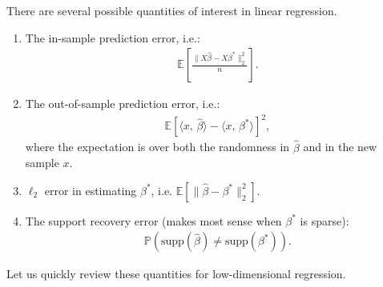 \documentclass[twoside,12pt]{article}
\newcommand{\inprod}[2]{\ensuremath{\langle #1 , \, #2 \rangle}}
\begin{document}
There are several possible quantities of interest in linear regression. 
\begin{enumerate}
\item The in-sample prediction error, i.e.:
\begin{align*}
\mathbb{E} \left[ \frac{\|X \widehat{\beta} - X \beta^*\|_2^2}{n}\right].
\end{align*}
\item The out-of-sample prediction error, i.e.:
\begin{align*}
\mathbb{E} \left[  \inprod{x}{\widehat{\beta}} - \inprod{x}{\beta^*} \right]^2,
\end{align*}
where the expectation is over both the randomness in $\widehat{\beta}$ and in the new sample $x$. 
\item $\ell_2$ error in estimating $\beta^*$, i.e. $\mathbb{E}[ \|\widehat{\beta} - \beta^*\|_2^2].$
\item The support recovery error (makes most sense when $\beta^*$ is sparse): 
\begin{align*}
\mathbb{P}( \text{supp}(\widehat{\beta}) \neq \text{supp}(\beta^*)).
\end{align*}
\end{enumerate}

Let us quickly review these quantities for low-dimensional regression.
\end{document}
